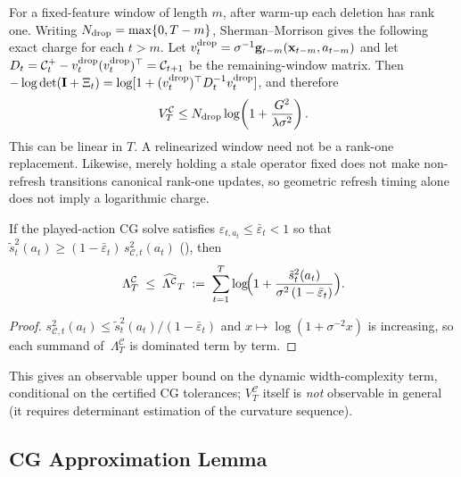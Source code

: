 \documentclass[twoside]{article}
\newcommand{\Calg}{\mathcal{C}}                 %
\newcommand{\Lamalg}{\Lambda^{\Calg}}           %
\newcommand{\Valg}{V^{\Calg}}                   %
\begin{document}
For a fixed-feature window of length $m$, after warm-up each deletion has
rank one.  Writing $N_{\rm drop}=\max\{0,T-m\}$, Sherman--Morrison gives the
following exact charge for each $t>m$.  Let
$v_t^{\rm drop}=\sigma^{-1}\mathbf{g}_{t-m}(\mathbf{x}_{t-m},a_{t-m})$ and let
$D_t=\Calg_t^+-v_t^{\rm drop}(v_t^{\rm drop})^\top=\Calg_{t+1}$ be the
remaining-window matrix.  Then
$-\log\det(\mathbf{I}+\Xi_t)=
\log[1+(v_t^{\rm drop})^\top D_t^{-1}v_t^{\rm drop}]$, and therefore
\[
 \Valg_T\le N_{\rm drop}\log\!\left(1+\frac{G^2}{\lambda\sigma^2}\right).
\]
This can be linear in $T$.  A relinearized window need not be a rank-one
replacement.  Likewise, merely holding a stale operator fixed does not make
non-refresh transitions canonical rank-one updates, so geometric refresh timing
alone does not imply a logarithmic charge.

\begin{corollary}\label{cor:lam-observable}
If the played-action CG solve satisfies $\varepsilon_{t,a_t}\le\bar\varepsilon_t<1$
so that $\tilde s_t^2(a_t)\ge(1-\bar\varepsilon_t)\,s_{\Calg,t}^2(a_t)$
(), then
\begin{equation}\label{eq:lam-observable}
  \Lamalg_T
  \;\le\;
  \widehat{\Lamalg}_T
  \;:=\;
  \sum_{t=1}^T
  \log\!\Bigl(1+\frac{\tilde s_t^2(a_t)}{\sigma^2\,(1-\bar\varepsilon_t)}\Bigr).
\end{equation}
\end{corollary}
\begin{proof}
$s_{\Calg,t}^2(a_t)\le\tilde s_t^2(a_t)/(1-\bar\varepsilon_t)$ and
$x\mapsto\log(1+\sigma^{-2}x)$ is increasing, so each summand
of~$\Lamalg_T$ is dominated term by term.
\end{proof}

\noindent
This gives an observable upper bound on the dynamic width-complexity term,
conditional on the certified CG tolerances; $\Valg_T$ itself is \emph{not}
observable in general (it requires determinant estimation of the curvature
sequence).



\subsection{CG Approximation Lemma}
\end{document}
